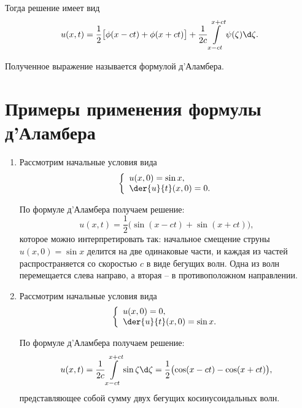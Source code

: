 Тогда решение имеет вид
\[
    u(x, t) = \frac{1}{2}\bigl[\phi(x - ct) + \phi(x + ct)\bigr] + \frac{1}{2c}
    \int\limits_{x - ct}^{x + ct} \psi(\zeta)\d\zeta.
\]

Полученное выражение называется формулой д'Аламбера.

\section{Примеры применения формулы д'Аламбера}
\begin{enumerate}
    \item Рассмотрим начальные условия вида 
    \[
        \left\{ \begin{array}{l}
            u(x, 0) = \sin x, \\
            \ds \der{u}{t}(x, 0) = 0.
        \end{array} \right.
    \]
    
    По формуле д'Аламбера получаем решение:
    \[
        u(x, t) = \frac{1}{2}\bigl(\sin(x - ct) + \sin(x + ct)\bigr),
    \]
    которое можно интерпретировать так: начальное смещение струны
    \( u(x, 0) = \sin x \) делится на две одинаковые части, и каждая из частей
    распространяется со скоростью \( c \) в виде бегущих волн.
    Одна из волн перемещается слева направо, а вторая -- в противоположном
    направлении.
    
    \item Рассмотрим начальные условия вида 
    \[
        \left\{ \begin{array}{l}
            u(x, 0) = 0, \\
            \ds \der{u}{t}(x, 0) = \sin x.
        \end{array} \right.
    \]
    
    По формуле д'Аламбера получаем решение:
    \[
        u(x, t) = \frac{1}{2c}\int\limits_{x - ct}^{x + ct} \sin\zeta\d\zeta =
        \frac{1}{2}\bigl(\cos(x - ct) - \cos(x + ct)\bigr),
    \]
    представляющее собой сумму двух бегущих косинусоидальных волн.
\end{enumerate}

\newpage
